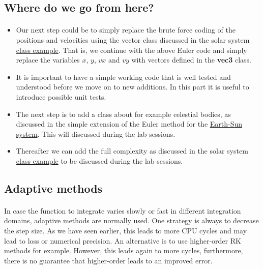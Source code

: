 \documentclass[%
oneside,                 %
final,                   %
10pt]{article}
\begin{document}
\subsection*{Where do we go from here?}

\paragraph{}

\begin{itemize}
\item Our next step could be to simply replace the brute force coding of the positions and velocities using the vector class discussed in the solar system  \href{{https://github.com/mortele/solar-system-fys3150}}{class example}. That is, we continue with the above Euler code and simply replace the variables $x$, $y$, $vx$ and $vy$ with vectors defined in the \textbf{vec3} class.

\item It is important to have a simple working code that is well tested and understood before we move on to new additions. In this part it is useful to introduce possible unit tests. 

\item The next step is to add a class about for example celestial bodies, as discussed in the simple extension of the Euler method for the \href{{https://github.com/andeplane/solar-system}}{Earth-Sun system}. This will discussed during the lab sessions.

\item Thereafter we can add the full complexity as discussed in the solar system \href{{https://github.com/mortele/solar-system-fys3150}}{class example} to be discussed during the lab sessions. 
\end{itemize}

\noindent



\subsection*{Adaptive methods}

\paragraph{}
In case the function to integrate varies slowly or fast in different integration domains, adaptive methods are normally used. One strategy is always to decrease the step size. As we have seen earlier, this leads to more CPU cycles and may lead to loss or numerical precision. An alternative is to use higher-order RK methods for example. However, this leads again to more cycles, furthermore, there is no guarantee that higher-order leads to an improved error.
\end{document}
